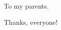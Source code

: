 
\maketitle


\makecopyright

\begin{dedication}
To my parents.
\end{dedication}

\begin{acknowledgments}
Thanks, everyone!
\end{acknowledgments}

\begin{abstract}

\end{abstract}

\contentspage


\figurelistpage

